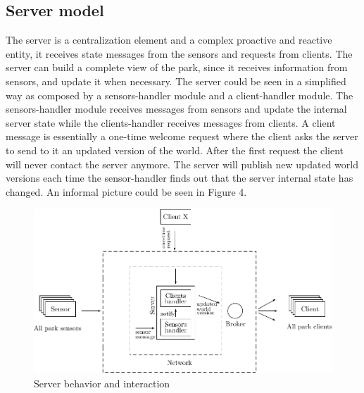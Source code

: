 \documentclass[11pt]{article}
\begin{document}
\subsection{Server model}
The server is a centralization element and a complex proactive and reactive entity, it receives state messages from the sensors and requests from clients. The server can build a complete view of the park, since it receives information from sensors, and update it when necessary. The server could be seen in a simplified way as composed by a sensors-handler module and a client-handler module. The sensors-handler module receives messages from sensors and update the internal server state while the clients-handler receives messages from clients. A client message is essentially a one-time welcome request where the client asks the server to send to it an updated version of the world. After the first request the client will never contact the server anymore. The server will publish new updated world versions each time the sensor-handler finds out that the server internal state has changed. An informal picture could be seen in Figure 4.
\begin{figure}
  \centering
	\includegraphics[scale=1]{server}
  \caption{Server behavior and interaction}
\end{figure}
\end{document}
